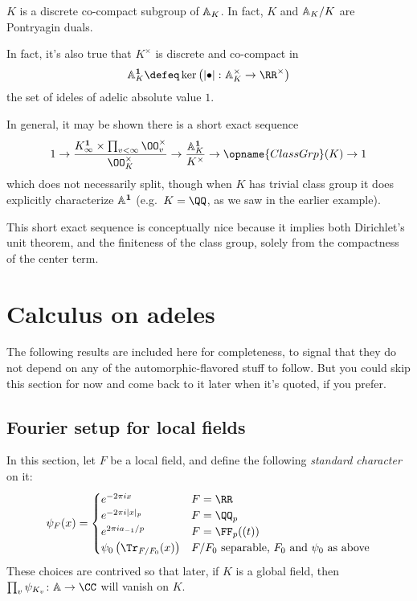 \begin{theorem}
  $K$ is a discrete co-compact subgroup of $\AA_K$.
  In fact, $K$ and $\AA_K/K$ are Pontryagin duals.
\end{theorem}

\begin{remark*}
In fact, it's also true that $K^\times$
is discrete and co-compact in
\[ \AA_K^{\mathbf 1} \defeq
  \ker \left(
    \left\lvert \bullet \right\rvert \colon
    \AA_K^\times \to \RR^\times
  \right) \]
the set of ideles of adelic absolute value $1$.

In general, it may be shown
there is a short exact sequence
\[
  1 \to \frac{K_\infty^{\mathbf 1} \times
    \prod_{v < \infty} \OO_v^\times}{\OO_K^\times}
    \to \frac{\AA_K^{\mathbf 1}}{K^\times}
    \to \opname{ClassGrp}(K) \to 1
\]
which does not necessarily split,
though when $K$ has trivial class group
it does explicitly characterize $\AA^{\mathbf 1}$
(e.g.\ $K=\QQ$, as we saw in the earlier example).

This short exact sequence is conceptually nice because
it implies both Dirichlet's unit theorem,
and the finiteness of the class group,
solely from the compactness of the center term.
\end{remark*}

\section{Calculus on adeles}
The following results are included here for completeness,
to signal that they do not depend on any of the
automorphic-flavored stuff to follow.
But you could skip this section for now
and come back to it later when it's quoted, if you prefer.

\subsection{Fourier setup for local fields}
In this section, let $F$ be a local field,
and define the following \emph{standard character} on it:
\[
  \psi_F(x)
  = \begin{cases}
    e^{-2\pi i x} & F = \RR \\
    e^{-2\pi i |x|_p} & F = \QQ_p \\
    e^{2\pi i a_{-1} /p} & F = \FF_p( (t) ) \\
    \psi_0\left( \Tr_{F/F_0}(x) \right) &
    \text{$F/F_0$ separable, $F_0$ and $\psi_0$ as above}
  \end{cases}
\]
These choices are contrived so that later,
if $K$ is a global field, then
$\prod_v \psi_{K_v} \colon \AA \to \CC$ will vanish on $K$.

